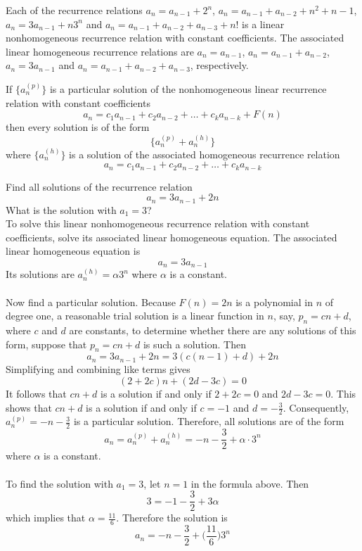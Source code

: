 \documentclass[12pt]{article}
\begin{document}
\begin{example} Each of the recurrence relations $a_n = a_{n - 1} + 2^n$, $a_n = a_{n - 1} + a_{n - 2} + n^2 + n - 1$, $a_n = 3a_{n -1} + n3^n$ and $a_n = a_{n - 1} + a_{n - 2} + a_{n - 3} + n!$ is a linear nonhomogeneous recurrence relation with constant coefficients. The associated linear homogeneous recurrence relations are $a_n = a_{n - 1}$, $a_n = a_{n - 1} + a_{n - 2}$, $a_n = 3a_{n - 1}$ and $a_n = a_{n - 1} + a_{n - 2} + a_{n - 3}$, respectively. \end{example} 

\begin{theorem} If $\{a_n^{(p)}\}$ is a particular solution of the nonhomogeneous linear recurrence relation with constant coefficients $$a_n = c_1a_{n - 1} + c_2a_{n - 2} + \dots + c_ka_{n - k} + F(n)$$ then every solution is of the form $$\{a_n^{(p)} + a_n^{(h)}\} $$ where $\{a_n^{(h)}\}$ is a solution of the associated homogeneous recurrence relation $$a_n = c_1a_{n -1} + c_2a_{n - 2} + \dots + c_ka_{n - k} $$ \end{theorem} 

\begin{example} Find all solutions of the recurrence relation $$a_n = 3a_{n - 1} + 2n$$ What is the solution with $a_1 = 3$? \\ 
To solve this linear nonhomogeneous recurrence relation with constant coefficients, solve its associated linear homogeneous equation. The associated linear homogeneous equation is $$a_n = 3a_{n - 1}$$ Its solutions are $a_n^{(h)} = \alpha3^n $ where $\alpha$ is a constant. \\~\\
Now find a particular solution. Because $F(n) = 2n$ is a polynomial in $n$ of degree one, a reasonable trial solution is a linear function in $n$, say, $p_n = cn + d$, where $c$ and $d$ are constants, to determine whether there are any solutions of this form, suppose that $p_n = cn + d$ is such a solution. Then $$a_n = 3a_{n - 1} + 2n = 3(c(n - 1) + d) + 2n $$ Simplifying and combining like terms gives $$(2 + 2c)n + (2d - 3c) = 0$$ It follows that $cn + d$ is a solution if and only if $2 + 2c = 0$ and $2d - 3c = 0$. This shows that $cn + d$ is a solution if and only if $c = -1$ and $d = -\frac{3}{2}$. Consequently, $a_n^{(p)} = -n - \frac{3}{2} $ is a particular solution. Therefore, all solutions are of the form $$a_n = a_n^{(p)} + a_n^{(h)} = -n - \frac{3}{2} + \alpha \cdot 3^n $$ where $\alpha$ is a constant. \\~\\ To find the solution with $a_1 = 3$, let $n = 1$ in the formula above. Then $$ 3 = -1 - \frac{3}{2} + 3\alpha$$ which implies that $\alpha = \frac{11}{6}$. Therefore the solution is $$a_n = -n - \frac{3}{2} + \Big(\frac{11}{6}\Big)3^n $$ \end{example} 
\end{document}
